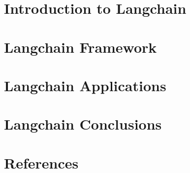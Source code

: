 \section[Intro]{Introduction to Langchain}


\section[FRM]{Langchain Framework}


\section[Apps]{Langchain Applications}


\section[Concl]{Langchain Conclusions}


\section[Refs]{References}
